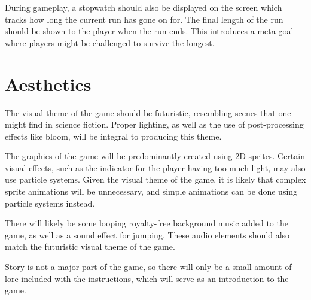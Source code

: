 \documentclass[10pt]{article}
\begin{document}
During gameplay, a stopwatch should also be displayed on the screen which tracks how long the current run has gone on for.
The final length of the run should be shown to the player when the run ends. This introduces a meta-goal where
players might be challenged to survive the longest.

\section{Aesthetics}

The visual theme of the game should be futuristic, resembling scenes that one might find in science fiction.
Proper lighting, as well as the use of post-processing effects like bloom, will be integral to producing this theme.

The graphics of the game will be predominantly created using 2D sprites. Certain visual effects, such as the indicator
for the player having too much light, may also use particle systems. Given the visual theme of the game, it is likely
that complex sprite animations will be unnecessary, and simple animations can be done using particle systems instead.

There will likely be some looping royalty-free background music added to the game, as well as a sound effect for jumping.
These audio elements should also match the futuristic visual theme of the game.

Story is not a major part of the game, so there will only be a small amount of lore included with the instructions,
which will serve as an introduction to the game.
\end{document}

